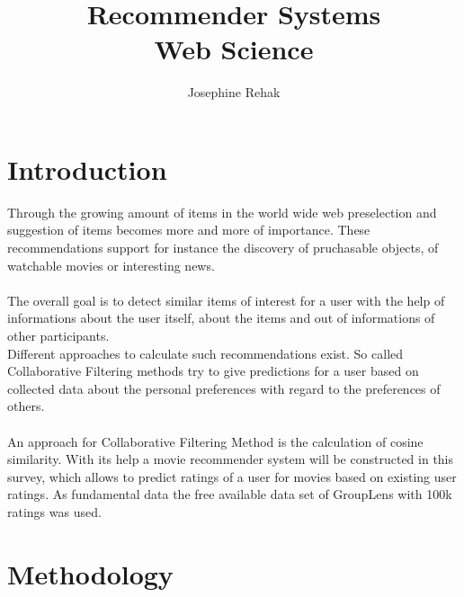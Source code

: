 \documentclass[a4paper,12pt,twoside]{article}
\title{Recommender Systems\\ Web Science}
\author{Josephine Rehak}
\begin{document}
\maketitle
\section{Introduction}
Through the growing amount of items in the world wide web preselection and suggestion of items becomes more and more of importance. These recommendations support for instance the discovery of pruchasable objects, of watchable movies or interesting news.\\
\\
The overall goal is to detect similar items of interest for a user with the help of informations about the user itself, about the items and out of informations of other participants. 
\cite{WebScience}\\
Different approaches to calculate such recommendations exist. So called Collaborative Filtering methods try to give predictions for a user based on collected data about the personal preferences with regard to the preferences of others. \\
\\
An approach for Collaborative Filtering Method is the calculation of cosine similarity. With its help a movie recommender system will be constructed in this survey, which allows to predict ratings of a user for movies based on existing user ratings. As fundamental data the free available data set of GroupLens with 100k ratings was used. \cite{grouplens}
 

\section{Methodology}
\end{document}
